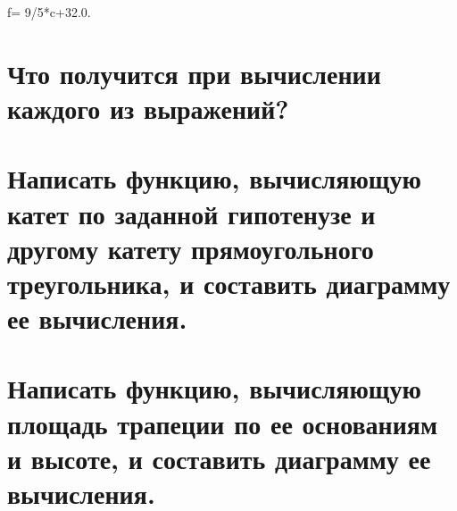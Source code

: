 f= 9/5*c+32.0.

\section{Что получится при вычислении каждого из выражений?}

\section{Написать функцию, вычисляющую катет по заданной гипотенузе и другому катету прямоугольного треугольника, и составить диаграмму ее вычисления.}

\section{Написать функцию, вычисляющую площадь трапеции по ее основаниям и 	высоте, и составить диаграмму ее вычисления.}